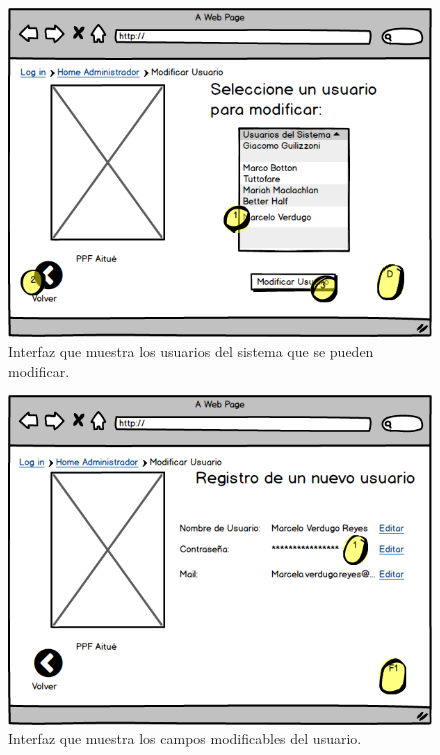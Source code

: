 \begin{figure}[h!]
	\label{moduser2}
	\begin{center}
		\includegraphics[scale=0.3]{imagenes/moduser2.png}
	\end{center}
	\caption{Interfaz que muestra los usuarios del sistema que se pueden modificar.}
\end{figure}

\begin{figure}[h!]
	\label{moduser3}
	\begin{center}
		\includegraphics[scale=0.3]{imagenes/moduser3.png}
	\end{center}
	\caption{Interfaz que muestra los campos modificables del usuario.}
\end{figure}


